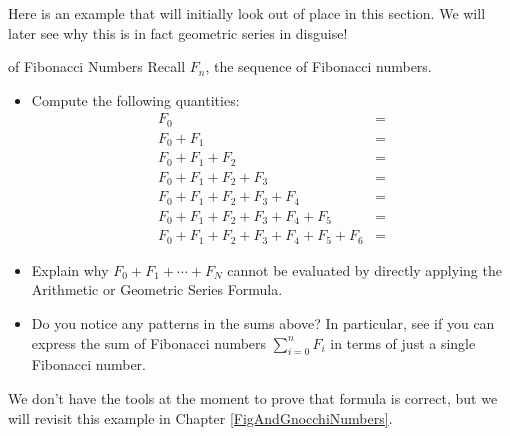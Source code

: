 Here is an example that will initially look out of place in this section.  We will later see why this is in fact geometric series in disguise!  

\begin{exercise}{ of Fibonacci Numbers \Coffeecup \Coffeecup \Coffeecup}\label{Lieonacci}
Recall $F_n$, the sequence of Fibonacci numbers. 
\begin{itemize} 
\item Compute the following quantities:
\begin{align*}
F_0&=\\
F_0+F_1&=\\
F_0+F_1+F_2&=\\
F_0+F_1+F_2+F_3&=\\
F_0+F_1+F_2+F_3+F_4&=\\
F_0+F_1+F_2+F_3+F_4+F_5&=\\
F_0+F_1+F_2+F_3+F_4+F_5+F_6&=
\end{align*}

\item Explain why $F_0+F_1+\cdots+F_N$ cannot be evaluated by directly applying the Arithmetic or Geometric Series Formula.

\vspace*{.5in}

\item Do you notice any patterns in the sums above?  In particular, see if you can express the sum of Fibonacci numbers $ \sum_{i=0}^n F_i$ in terms of just a single Fibonacci number.

\vspace*{1in}
\end{itemize}
\end{exercise}
We don't have the tools at the moment to prove that formula is correct, but we will revisit this example in Chapter \ref{FigAndGnocchiNumbers}.
